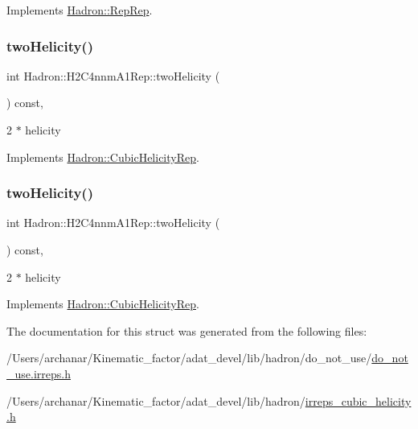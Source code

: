 Implements \mbox{\hyperlink{structHadron_1_1RepRep_ab3213025f6de249f7095892109575fde}{Hadron\+::\+Rep\+Rep}}.

\mbox{\label{structHadron_1_1H2C4nnmA1Rep_ae55afbd5a5aede69fcb5415b54b00b07}} 
\subsubsection{\texorpdfstring{twoHelicity()}{twoHelicity()}\hspace{0.1cm}{\footnotesize\ttfamily [1/2]}}
{\footnotesize\ttfamily int Hadron\+::\+H2\+C4nnm\+A1\+Rep\+::two\+Helicity (\begin{DoxyParamCaption}{ }\end{DoxyParamCaption}) const\hspace{0.3cm}{\ttfamily [inline]}, {\ttfamily [virtual]}}

2 $\ast$ helicity 

Implements \mbox{\hyperlink{structHadron_1_1CubicHelicityRep_af507aa56fc2747eacc8cb6c96db31ecc}{Hadron\+::\+Cubic\+Helicity\+Rep}}.

\mbox{\label{structHadron_1_1H2C4nnmA1Rep_ae55afbd5a5aede69fcb5415b54b00b07}} 
\subsubsection{\texorpdfstring{twoHelicity()}{twoHelicity()}\hspace{0.1cm}{\footnotesize\ttfamily [2/2]}}
{\footnotesize\ttfamily int Hadron\+::\+H2\+C4nnm\+A1\+Rep\+::two\+Helicity (\begin{DoxyParamCaption}{ }\end{DoxyParamCaption}) const\hspace{0.3cm}{\ttfamily [inline]}, {\ttfamily [virtual]}}

2 $\ast$ helicity 

Implements \mbox{\hyperlink{structHadron_1_1CubicHelicityRep_af507aa56fc2747eacc8cb6c96db31ecc}{Hadron\+::\+Cubic\+Helicity\+Rep}}.



The documentation for this struct was generated from the following files\+:\begin{DoxyCompactItemize}
\item 
/\+Users/archanar/\+Kinematic\+\_\+factor/adat\+\_\+devel/lib/hadron/do\+\_\+not\+\_\+use/\mbox{\hyperlink{do__not__use_8irreps_8h}{do\+\_\+not\+\_\+use.\+irreps.\+h}}\item 
/\+Users/archanar/\+Kinematic\+\_\+factor/adat\+\_\+devel/lib/hadron/\mbox{\hyperlink{lib_2hadron_2irreps__cubic__helicity_8h}{irreps\+\_\+cubic\+\_\+helicity.\+h}}\end{DoxyCompactItemize}
